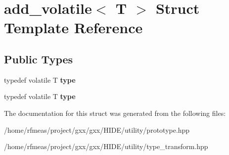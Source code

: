 \hypertarget{structadd__volatile}{}\section{add\+\_\+volatile$<$ T $>$ Struct Template Reference}
\label{structadd__volatile}
\subsection*{Public Types}
\begin{DoxyCompactItemize}
\item 
typedef volatile T {\bfseries type}\hypertarget{structadd__volatile_a8e70e0056271e83273f7e52b7dadf43a}{}\label{structadd__volatile_a8e70e0056271e83273f7e52b7dadf43a}

\item 
typedef volatile T {\bfseries type}\hypertarget{structadd__volatile_a8e70e0056271e83273f7e52b7dadf43a}{}\label{structadd__volatile_a8e70e0056271e83273f7e52b7dadf43a}

\end{DoxyCompactItemize}


The documentation for this struct was generated from the following files\+:\begin{DoxyCompactItemize}
\item 
/home/rfmeas/project/gxx/gxx/\+H\+I\+D\+E/utility/prototype.\+hpp\item 
/home/rfmeas/project/gxx/gxx/\+H\+I\+D\+E/utility/type\+\_\+transform.\+hpp\end{DoxyCompactItemize}
